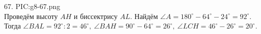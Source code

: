 67. {{PIC:g8-67.png}}\\
Проведём высоту $AH$ и биссектрису $AL.$ Найдём $\angle A=180^\circ-64^\circ-24^\circ=92^\circ.$ Тогда $\angle BAL=92^\circ:2=46^\circ,\ \angle BAH=90^\circ-64^\circ=26^\circ,\ \angle LCH=46^\circ-26^\circ=20^\circ.$\newpage\noindent
